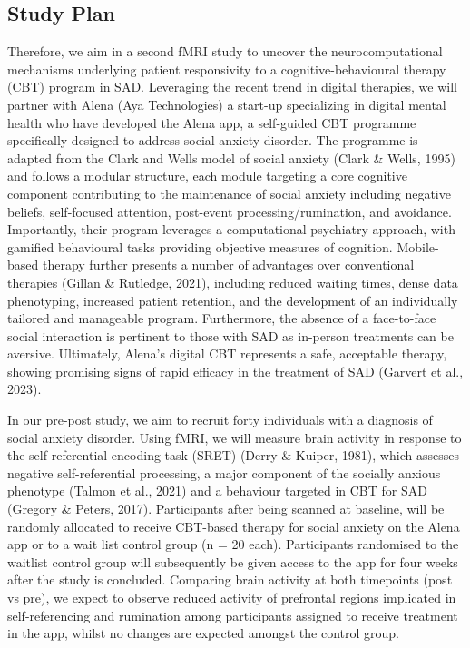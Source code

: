 \documentclass[12pt,a4paper,oneside,]{book} %
\begin{document}
\subsection{Study Plan}\label{study-plan-1}

Therefore, we aim in a second fMRI study to uncover the neurocomputational mechanisms underlying patient responsivity to a cognitive-behavioural therapy (CBT) program in SAD. Leveraging the recent trend in digital therapies, we will partner with Alena (Aya Technologies) a start-up specializing in digital mental health who have developed the Alena app, a self-guided CBT programme specifically designed to address social anxiety disorder. The programme is adapted from the Clark and Wells model of social anxiety (Clark \& Wells, 1995) and follows a modular structure, each module targeting a core cognitive component contributing to the maintenance of social anxiety including negative beliefs, self-focused attention, post-event processing/rumination, and avoidance. Importantly, their program leverages a computational psychiatry approach, with gamified behavioural tasks providing objective measures of cognition. Mobile-based therapy further presents a number of advantages over conventional therapies (Gillan \& Rutledge, 2021), including reduced waiting times, dense data phenotyping, increased patient retention, and the development of an individually tailored and manageable program. Furthermore, the absence of a face-to-face social interaction is pertinent to those with SAD as in-person treatments can be aversive. Ultimately, Alena's digital CBT represents a safe, acceptable therapy, showing promising signs of rapid efficacy in the treatment of SAD (Garvert et al., 2023).

In our pre-post study, we aim to recruit forty individuals with a diagnosis of social anxiety disorder. Using fMRI, we will measure brain activity in response to the self-referential encoding task (SRET) (Derry \& Kuiper, 1981), which assesses negative self-referential processing, a major component of the socially anxious phenotype (Talmon et al., 2021) and a behaviour targeted in CBT for SAD (Gregory \& Peters, 2017). Participants after being scanned at baseline, will be randomly allocated to receive CBT-based therapy for social anxiety on the Alena app or to a wait list control group (n = 20 each). Participants randomised to the waitlist control group will subsequently be given access to the app for four weeks after the study is concluded. Comparing brain activity at both timepoints (post vs pre), we expect to observe reduced activity of prefrontal regions implicated in self-referencing and rumination among participants assigned to receive treatment in the app, whilst no changes are expected amongst the control group.
\end{document}
